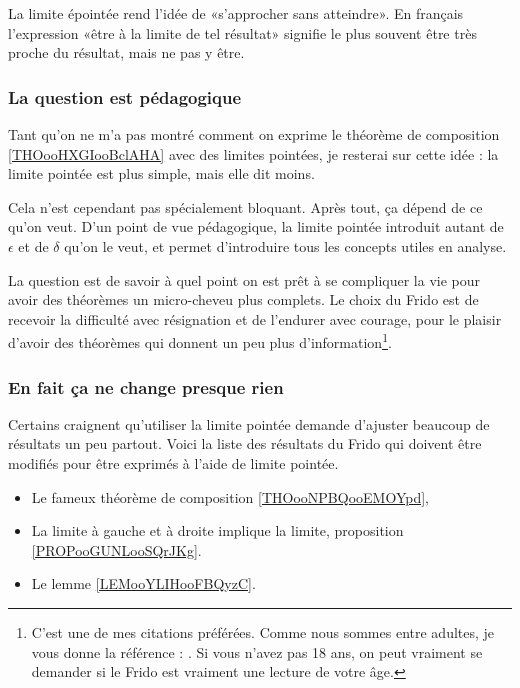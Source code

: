 La limite épointée rend l'idée de «s'approcher sans atteindre». En français l'expression «être à la limite de tel résultat» signifie le plus souvent être très proche du résultat, mais ne pas y être.

\subsubsection{La question est pédagogique}

Tant qu'on ne m'a pas montré comment on exprime le théorème de composition \ref{THOooHXGIooBclAHA} avec des limites pointées, je resterai sur cette idée : la limite pointée est plus simple, mais elle dit moins.

Cela n'est cependant pas spécialement bloquant. Après tout, ça dépend de ce qu'on veut. D'un point de vue pédagogique, la limite pointée introduit autant de \( \epsilon\) et de \( \delta\) qu'on le veut, et permet d'introduire tous les concepts utiles en analyse.

La question est de savoir à quel point on est prêt à se compliquer la vie pour avoir des théorèmes un micro-cheveu plus complets. Le choix du Frido est de recevoir la difficulté avec résignation et de l'endurer avec courage, pour le plaisir d'avoir des théorèmes qui donnent un peu plus d'information\footnote{C'est une de mes citations préférées. Comme nous sommes entre adultes, je vous donne la référence : \cite{BIBooTOVWooSDsNrc}. Si vous n'avez pas 18 ans, on peut vraiment se demander si le Frido est vraiment une lecture de votre âge.}.

\subsubsection{En fait ça ne change presque rien}

Certains craignent qu'utiliser la limite pointée demande d'ajuster beaucoup de résultats un peu partout\cite{BIBooTOVWooSDsNrc}. Voici la liste des résultats du Frido qui doivent être modifiés pour être exprimés à l'aide de limite pointée.
\begin{itemize}
	\item
	      Le fameux théorème de composition \ref{THOooNPBQooEMOYpd},
	\item
	      La limite à gauche et à droite implique la limite, proposition \ref{PROPooGUNLooSQrJKg}.
	\item
	      Le lemme \ref{LEMooYLIHooFBQyzC}.
\end{itemize}

